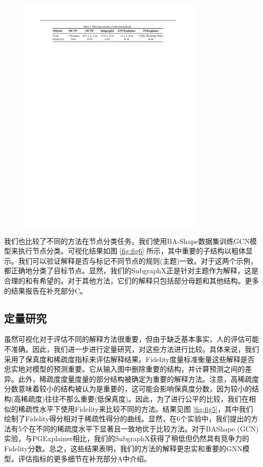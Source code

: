 \documentclass[final]{cvpr}
\begin{document}
\begin{figure}[t!]
  \centering
  \includegraphics[width=0.8\textwidth]{table2.pdf}
\end{figure}

我们也比较了不同的方法在节点分类任务。我们使用BA-Shape数据集训练GCN模型来执行节点分类。可视化结果如图 \ref{fig:fig6} 所示，其中重要的子结构以粗体显示。我们可以验证解释是否与标记不同节点的规则(主题)一致。对于这两个示例，都正确地分类了目标节点。显然，我们的SubgraphX正是针对主题作为解释，这是合理的和有希望的。对于其他方法，它们的解释只包括部分母题和其他结构。更多的结果报告在补充部分C。



\subsection{定量研究}

虽然可视化对于评估不同的解释方法很重要，但由于缺乏基本事实，人的评估可能不准确。因此，我们进一步进行定量研究，对这些方法进行比较。具体来说，我们采用了保真度和稀疏度指标来评估解释结果。Fidelity度量标准衡量这些解释是否忠实地对模型的预测重要。它从输入图中删除重要的结构，并计算预测之间的差异。此外，稀疏度度量度量的部分结构被确定为重要的解释方法。注意，高稀疏度分数意味着较小的结构被认为是重要的，这可能会影响保真度分数，因为较小的结构(高稀疏度)往往不那么重要(低保真度)。因此，为了进行公平的比较，我们在相似的稀疏性水平下使用Fidelity来比较不同的方法。结果见图 \ref{fig:fig5}，其中我们绘制了Fidelity得分相对于稀疏性得分的曲线。显然，在6个实验中，我们提出的方法有5个在不同的稀疏度水平下显著且一致地优于比较方法。对于BAShape (GCN)实验，与PGExplainer相比，我们的SubgraphX获得了稍低但仍然具有竞争力的Fidelity分数。总之，这些结果表明，我们的方法的解释更忠实和重要的GNN模型。评估指标的更多细节在补充部分A中介绍。
\end{document}
